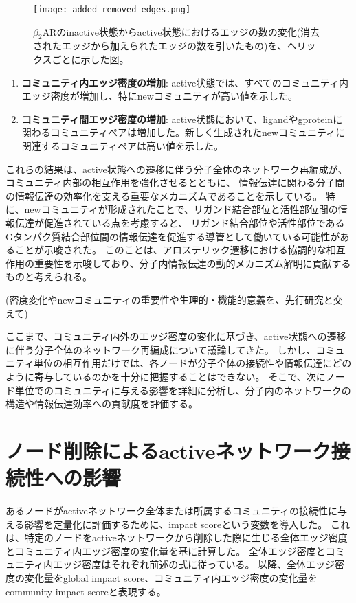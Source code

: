 \begin{figure}[htbp]
  \centering
  \texttt{[image: added\_removed\_edges.png]}
  \caption{$\beta_2$ARのinactive状態からactive状態におけるエッジの数の変化(消去されたエッジから加えられたエッジの数を引いたもの)を、ヘリックスごとに示した図。}
  \label{fig:inter}
\end{figure}

\newpage


\begin{enumerate}
  \item \textbf{コミュニティ内エッジ密度の増加}: active状態では、すべてのコミュニティ内エッジ密度が増加し、特にnewコミュニティが高い値を示した。
  \item \textbf{コミュニティ間エッジ密度の増加}: active状態において、ligandやgproteinに関わるコミュニティペアは増加した。新しく生成されたnewコミュニティに関連するコミュニティペアは高い値を示した。
\end{enumerate}

これらの結果は、active状態への遷移に伴う分子全体のネットワーク再編成が、
コミュニティ内部の相互作用を強化させるとともに、
情報伝達に関わる分子間の情報伝達の効率化を支える重要なメカニズムであることを示している。
特に、newコミュニティが形成されたことで、リガンド結合部位と活性部位間の情報伝達が促進されている点を考慮すると、
リガンド結合部位や活性部位であるGタンパク質結合部位間の情報伝達を促進する導管として働いている可能性があることが示唆された。
このことは、アロステリック遷移における協調的な相互作用の重要性を示唆しており、分子内情報伝達の動的メカニズム解明に貢献するものと考えられる。

(密度変化やnewコミュニティの重要性や生理的・機能的意義を、先行研究と交えて)

ここまで、コミュニティ内外のエッジ密度の変化に基づき、active状態への遷移に伴う分子全体のネットワーク再編成について議論してきた。
しかし、コミュニティ単位の相互作用だけでは、各ノードが分子全体の接続性や情報伝達にどのように寄与しているのかを十分に把握することはできない。
そこで、次にノード単位でのコミュニティに与える影響を詳細に分析し、分子内のネットワークの構造や情報伝達効率への貢献度を評価する。


\section{ノード削除によるactiveネットワーク接続性への影響}

あるノードがactiveネットワーク全体または所属するコミュニティの接続性に与える影響を定量化に評価するために、impact scoreという変数を導入した。
これは、特定のノードをactiveネットワークから削除した際に生じる全体エッジ密度とコミュニティ内エッジ密度の変化量を基に計算した。
全体エッジ密度とコミュニティ内エッジ密度はそれぞれ前述の式に従っている。
以降、全体エッジ密度の変化量をglobal impact score、コミュニティ内エッジ密度の変化量をcommunity impact scoreと表現する。

